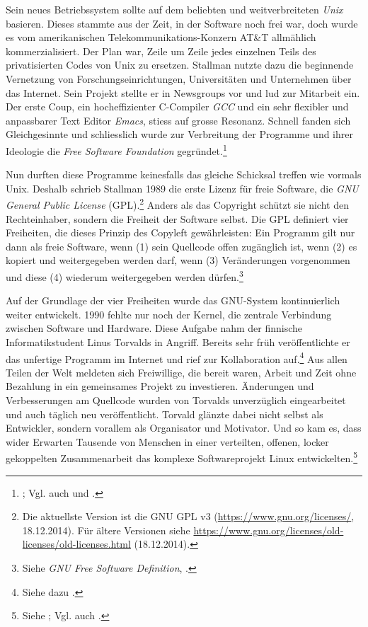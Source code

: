 \documentclass[
paper=164mm:234mm, %
pagesize, %
DIV=calc, %
10pt, %
parskip=half- %
]{scrbook}
\begin{document}
Sein neues Betriebssystem sollte auf dem beliebten und weitverbreiteten \emph{Unix} basieren. Dieses stammte aus der Zeit, in der Software noch frei war, doch wurde es vom amerikanischen Telekommunikations-Konzern AT\&T allmählich kommerzialisiert. Der Plan war, Zeile um Zeile jedes einzelnen Teils des privatisierten Codes von Unix zu ersetzen. Stallman nutzte dazu die beginnende Vernetzung von Forschungseinrichtungen, Universitäten und Unternehmen über das Internet. Sein Projekt stellte er in Newsgroups vor und lud zur Mitarbeit ein. Der erste Coup, ein hocheffizienter C-Compiler \emph{GCC} und ein sehr flexibler und anpassbarer Text Editor \emph{Emacs}, stiess auf grosse Resonanz. Schnell fanden sich Gleichgesinnte und schliesslich wurde zur Verbreitung der Programme und ihrer Ideologie die \emph{Free Software Foundation} gegründet.\footnote{\cite[7-25]{Stallman:2010}; Vgl. auch \cite[217-227]{Grassmuck:2004} und \cite[18-19]{Raymond:1999}.}

Nun durften diese Programme keinesfalls das gleiche Schicksal treffen wie vormals Unix. Deshalb schrieb Stallman 1989 die erste Lizenz für freie Software, die \emph{GNU General Public License} (GPL).\footnote{Die aktuellste Version ist die GNU GPL v3 (\url{https://www.gnu.org/licenses/}, 18.12.2014). Für ältere Versionen siehe \url{https://www.gnu.org/licenses/old-licenses/old-licenses.html} (18.12.2014).} Anders als das Copyright schützt sie nicht den Rechteinhaber, sondern die Freiheit der Software selbst. Die GPL definiert vier Freiheiten, die dieses Prinzip des Copyleft gewährleisten: Ein Programm gilt nur dann als freie Software, wenn (1) sein Quellcode offen zugänglich ist, wenn (2) es kopiert und weitergegeben werden darf, wenn (3) Veränderungen vorgenommen und diese (4) wiederum weitergegeben werden dürfen.\footnote{Siehe \emph{GNU Free Software Definition}, \cite[3]{Stallman:2010}.}

Auf der Grundlage der vier Freiheiten wurde das GNU-System kontinuierlich weiter entwickelt. 1990 fehlte nur noch der Kernel, die zentrale Verbindung zwischen Software und Hardware. Diese Aufgabe nahm der finnische Informatikstudent Linus Torvalds in Angriff. Bereits sehr früh veröffentlichte er das unfertige Programm im Internet und rief zur Kollaboration auf.\footnote{Siehe dazu \cite{Torvalds:1999}.} Aus allen Teilen der Welt meldeten sich Freiwillige, die bereit waren, Arbeit und Zeit ohne Bezahlung in ein gemeinsames Projekt zu investieren. Änderungen und Verbesserungen am Quellcode wurden von Torvalds unverzüglich eingearbeitet und auch täglich neu veröffentlicht. Torvald glänzte dabei nicht selbst als Entwickler, sondern vorallem als Organisator und Motivator. Und so kam es, dass wider Erwarten Tausende von Menschen in einer verteilten, offenen, locker gekoppelten Zusammenarbeit das komplexe Softwareprojekt Linux entwickelten.\footnote{Siehe \cite{Raymond:2001}; Vgl. auch \cite[227]{Grassmuck:2004}.}
\end{document}
